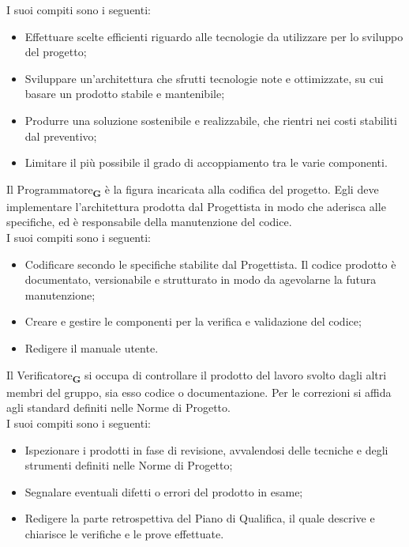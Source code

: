 I suoi compiti sono i seguenti:
\begin {itemize}
    \item Effettuare scelte efficienti riguardo alle tecnologie da utilizzare per lo sviluppo del progetto;
    \item Sviluppare un'architettura che sfrutti tecnologie note e ottimizzate, su cui basare un prodotto stabile e mantenibile;
    \item Produrre una soluzione sostenibile e realizzabile, che rientri nei costi stabiliti dal preventivo;
    \item Limitare il più possibile il grado di accoppiamento tra le varie componenti.
\end {itemize}
Il Programmatore\textsubscript{\textbf{G}} è la figura incaricata alla codifica del progetto. Egli deve implementare l’architettura prodotta dal Progettista in modo che aderisca alle specifiche, ed è responsabile della manutenzione del codice.\\
I suoi compiti sono i seguenti:
\begin {itemize}
    \item Codificare secondo le specifiche stabilite dal Progettista. Il codice prodotto è documentato, versionabile e strutturato in modo da agevolarne la futura manutenzione;
    \item Creare e gestire le componenti per la verifica e validazione del codice;
    \item Redigere il manuale utente.
\end {itemize}
Il Verificatore\textsubscript{\textbf{G}} si occupa di controllare il prodotto del lavoro svolto dagli altri membri del gruppo, sia esso codice o documentazione. Per le correzioni si affida agli standard definiti nelle Norme di Progetto.\\
I suoi compiti sono i seguenti:
\begin {itemize}
    \item Ispezionare i prodotti in fase di revisione, avvalendosi delle tecniche e degli strumenti definiti nelle Norme di Progetto;
    \item Segnalare eventuali difetti o errori del prodotto in esame;
    \item Redigere la parte retrospettiva del Piano di Qualifica, il quale descrive e chiarisce le verifiche e le prove effettuate.
\end {itemize}
